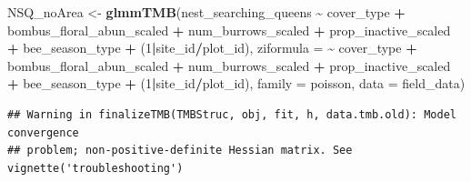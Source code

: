 \documentclass[
]{article}
\newenvironment{Shaded}{\begin{snugshade}}{\end{snugshade}}
\newcommand{\AttributeTok}[1]{\textcolor[rgb]{0.13,0.29,0.53}{#1}}
\newcommand{\DecValTok}[1]{\textcolor[rgb]{0.00,0.00,0.81}{#1}}
\newcommand{\FunctionTok}[1]{\textcolor[rgb]{0.13,0.29,0.53}{\textbf{#1}}}
\newcommand{\NormalTok}[1]{#1}
\newcommand{\OtherTok}[1]{\textcolor[rgb]{0.56,0.35,0.01}{#1}}
\newcommand{\SpecialCharTok}[1]{\textcolor[rgb]{0.81,0.36,0.00}{\textbf{#1}}}
\begin{document}
\begin{Shaded}
\begin{Highlighting}[]
\NormalTok{NSQ\_noArea }\OtherTok{\textless{}{-}} \FunctionTok{glmmTMB}\NormalTok{(nest\_searching\_queens }\SpecialCharTok{\textasciitilde{}}\NormalTok{ cover\_type }\SpecialCharTok{+} 
\NormalTok{                        bombus\_floral\_abun\_scaled }\SpecialCharTok{+} 
\NormalTok{                        num\_burrows\_scaled }\SpecialCharTok{+} 
\NormalTok{                        prop\_inactive\_scaled }\SpecialCharTok{+}
\NormalTok{                        bee\_season\_type }\SpecialCharTok{+} 
\NormalTok{                        (}\DecValTok{1}\SpecialCharTok{|}\NormalTok{site\_id}\SpecialCharTok{/}\NormalTok{plot\_id),}
                      \AttributeTok{ziformula =} \SpecialCharTok{\textasciitilde{}}\NormalTok{ cover\_type }\SpecialCharTok{+} 
\NormalTok{                        bombus\_floral\_abun\_scaled }\SpecialCharTok{+} 
\NormalTok{                        num\_burrows\_scaled }\SpecialCharTok{+} 
\NormalTok{                        prop\_inactive\_scaled }\SpecialCharTok{+}
\NormalTok{                        bee\_season\_type }\SpecialCharTok{+}
\NormalTok{                        (}\DecValTok{1}\SpecialCharTok{|}\NormalTok{site\_id}\SpecialCharTok{/}\NormalTok{plot\_id),}
                      \AttributeTok{family =}\NormalTok{ poisson, }
                      \AttributeTok{data =}\NormalTok{ field\_data)}
\end{Highlighting}
\end{Shaded}

\begin{verbatim}
## Warning in finalizeTMB(TMBStruc, obj, fit, h, data.tmb.old): Model convergence
## problem; non-positive-definite Hessian matrix. See vignette('troubleshooting')
\end{verbatim}
\end{document}
